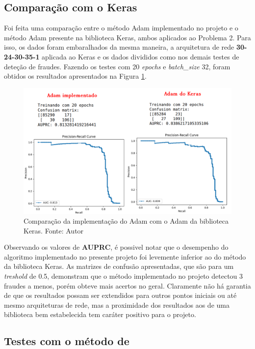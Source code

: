 \documentclass[11pt]{article}
\begin{document}
\subsection*{Comparação com o Keras}
Foi feita uma comparação entre o método Adam implementado no projeto e o método Adam presente na biblioteca Keras, ambos aplicados ao Problema 2. Para isso, os dados foram embaralhados da mesma maneira, a arquitetura de rede \textbf{30-24-30-35-1} aplicada ao Keras e os dados divididos como nos demais testes de deteção de fraudes. Fazendo os testes com 20 \textit{epochs} e \textit{batch\_size} 32, foram obtidos os resultados apresentados na Figura \ref{AVK}.

\begin{figure}[H]
\center
\includegraphics[scale=0.5]{Figuras/ADAM_VS_KERAS.png}
\caption{Comparação da implementação do Adam com o Adam da biblioteca Keras. Fonte: Autor} 
\label{AVK}
\end{figure}


\noindent
Observando os valores de \textbf{AUPRC}, é possivel notar que o desempenho do algoritmo implementado no presente projeto foi levemente inferior ao do método da biblioteca Keras. As matrizes de confusão apresentadas, que são para um \textit{treshold} de 0.5, demonstram que o método implementado no projeto detectou 3 fraudes a menos, porém obteve mais acertos no geral. Claramente não há garantia de que os resultados possam ser extendidos para outros pontos iniciais ou até mesmo arquiteturas de rede, mas a proximidade dos resultados aos de uma biblioteca bem estabelecida tem caráter positivo para o projeto.



\subsection*{Testes com o método de \cite{bmLS}}
\end{document}
